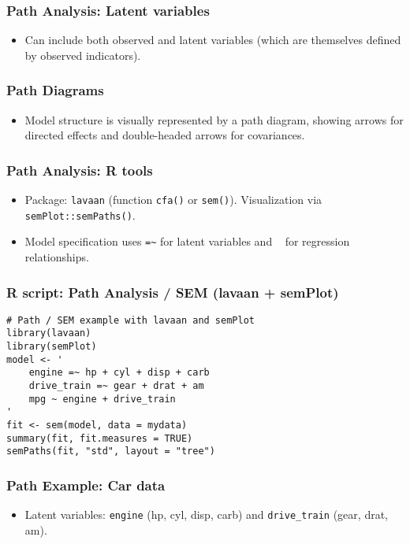\documentclass{beamer}
\newcommand{\code}[1]{\texttt{#1}}
\begin{document}
\begin{frame}
    \frametitle{Path Analysis: Latent variables}
    \begin{itemize}
        \item Can include both observed and \alert{latent variables} (which are themselves defined by observed indicators).
    \end{itemize}
\end{frame}

\begin{frame}
    \frametitle{Path Diagrams}
    \begin{itemize}
        \item Model structure is visually represented by a \alert{path diagram}, showing arrows for directed effects and double-headed arrows for covariances.
    \end{itemize}
\end{frame}

\begin{frame}
    \frametitle{Path Analysis: R tools}
    \begin{itemize}
        \item Package: \code{lavaan} (function \code{cfa()} or \code{sem()}). Visualization via \code{semPlot::semPaths()}.
        \item Model specification uses \texttt{=\~} for latent variables and \texttt{~} for regression relationships.
    \end{itemize}
\end{frame}

\begin{frame}[fragile]
        \frametitle{R script: Path Analysis / SEM (lavaan + semPlot)}
        \begin{verbatim}
# Path / SEM example with lavaan and semPlot
library(lavaan)
library(semPlot)
model <- '
    engine =~ hp + cyl + disp + carb
    drive_train =~ gear + drat + am
    mpg ~ engine + drive_train
'
fit <- sem(model, data = mydata)
summary(fit, fit.measures = TRUE)
semPaths(fit, "std", layout = "tree")
        \end{verbatim}
\end{frame}

\begin{frame}
    \frametitle{Path Example: Car data}
    \begin{itemize}
        \item Latent variables: \texttt{engine} (hp, cyl, disp, carb) and \texttt{drive\_train} (gear, drat, am).
    \end{itemize}
\end{frame}
\end{document}
